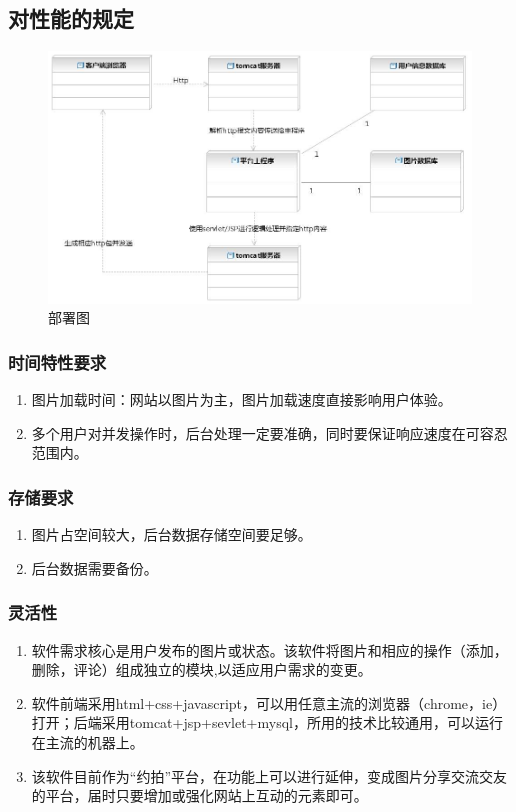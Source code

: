 \documentclass[a4paper,14pt]{ctexart}
\begin{document}
\subsection{对性能的规定}

\begin{figure}[H]
\centering\includegraphics[width=4.5in]{部署图.jpeg}
\caption{部署图}
\label{fig:15}
\end{figure}

\subsubsection{时间特性要求}
\begin{enumerate}[1)]
\item 图片加载时间：网站以图片为主，图片加载速度直接影响用户体验。

\item 多个用户对并发操作时，后台处理一定要准确，同时要保证响应速度在可容忍范围内。


\end{enumerate}
\subsubsection{存储要求}
\begin{enumerate} [1)]
\item 图片占空间较大，后台数据存储空间要足够。

\item 后台数据需要备份。


\end{enumerate}
\subsubsection{灵活性}
\begin{enumerate} [1)]
\item 软件需求核心是用户发布的图片或状态。该软件将图片和相应的操作（添加，删除，评论）组成独立的模块,以适应用户需求的变更。
   

\item 软件前端采用html+css+javascript，可以用任意主流的浏览器（chrome，ie）打开；后端采用tomcat+jsp+sevlet+mysql，所用的技术比较通用，可以运行在主流的机器上。
    

\item  该软件目前作为“约拍”平台，在功能上可以进行延伸，变成图片分享交流交友的平台，届时只要增加或强化网站上互动的元素即可。
\end{enumerate}
\end{document}
